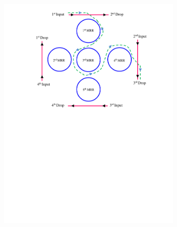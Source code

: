 \documentclass{osa-article}
\begin{document}
\begin{figure}[h!]
\begin{subfigure}[b]{0.4\linewidth}
    \includegraphics[width=\linewidth]{figs/fig4a_ID133.pdf}
    \caption{}
  \end{subfigure}
  \begin{subfigure}[b]{0.4\linewidth}

\end{subfigure}
\end{figure}
\end{document}

